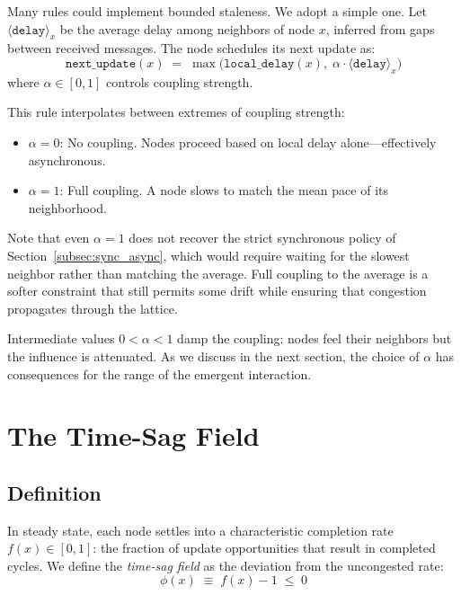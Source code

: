 \documentclass[aps, pra, reprint, superscriptaddress, nofootinbib, singlespacing]{revtex4-2}
\begin{document}
Many rules could implement bounded staleness. We adopt a simple one. Let $\langle\texttt{delay}\rangle_x$ be the average delay among neighbors of node $x$, inferred from gaps between received messages. The node schedules its next update as:
\begin{equation}
    \texttt{next\_update}(x) \;=\; \max\bigl(\texttt{local\_delay}(x),\; \alpha \cdot \langle\texttt{delay}\rangle_x\bigr)
    \label{eq:sync-rule}
\end{equation}
where $\alpha \in [0,1]$ controls coupling strength.

This rule interpolates between extremes of coupling strength:
\begin{itemize}
    \item $\alpha = 0$: No coupling. Nodes proceed based on local delay alone—effectively asynchronous.
    \item $\alpha = 1$: Full coupling. A node slows to match the mean pace of its neighborhood.
\end{itemize}

Note that even $\alpha = 1$ does not recover the strict synchronous policy of Section~\ref{subsec:sync_async}, which would require waiting for the slowest neighbor rather than matching the average. Full coupling to the average is a softer constraint that still permits some drift while ensuring that congestion propagates through the lattice.

Intermediate values $0 < \alpha < 1$ damp the coupling: nodes feel their neighbors but the influence is attenuated. As we discuss in the next section, the choice of $\alpha$ has consequences for the range of the emergent interaction.

\section{The Time-Sag Field}
\label{sec:timesag}

\subsection{Definition}
\label{subsec:timesag_def}

In steady state, each node settles into a characteristic completion rate $f(x) \in [0,1]$: the fraction of update opportunities that result in completed cycles. We define the \emph{time-sag field} as the deviation from the uncongested rate:
\begin{equation}
    \phi(x) \;\equiv\; f(x) - 1 \;\leq\; 0
    \label{eq:timesag-def}
\end{equation}
\end{document}
